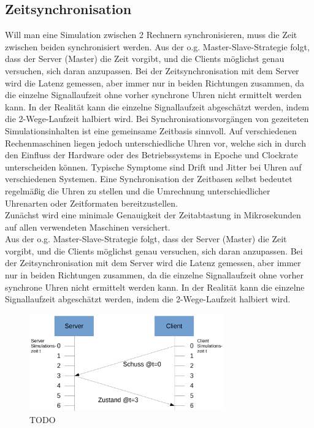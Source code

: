\subsection{Zeitsynchronisation}

Will man eine Simulation zwischen 2 Rechnern synchronisieren, muss die Zeit zwischen beiden synchronisiert werden. Aus der o.g. Master-Slave-Strategie folgt, dass der Server (Master) die Zeit vorgibt, und die Clients möglichst genau versuchen, sich daran anzupassen. Bei der Zeitsynchronisation mit dem Server wird die Latenz gemessen, aber immer nur in beiden Richtungen zusammen, da die einzelne Signallaufzeit ohne vorher synchrone Uhren nicht ermittelt werden kann. In der Realität kann die einzelne Signallaufzeit abgeschätzt werden, indem die 2-Wege-Laufzeit halbiert wird.
Bei Synchronisationsvorgängen von gezeiteten Simulationsinhalten ist eine gemeinsame Zeitbasis sinnvoll.
Auf verschiedenen Rechenmaschinen liegen jedoch unterschiedliche Uhren vor, welche sich
in durch den Einfluss der Hardware oder des Betriebssystems in Epoche und Clockrate unterscheiden können. Typische Symptome sind Drift und Jitter bei Uhren auf verschiedenen Systemen.
Eine Synchronisation der Zeitbasen selbst bedeutet regelmäßig die Uhren zu stellen und die Umrechnung
unterschiedlicher Uhrenarten oder Zeitformaten bereitzustellen.\\
Zunächst wird eine minimale Genauigkeit der Zeitabtastung in Mikrosekunden auf allen verwendeten Maschinen versichert.\\
Aus der o.g. Master-Slave-Strategie folgt, dass der Server (Master) die Zeit vorgibt, und die Clients möglichst genau versuchen, sich daran anzupassen. Bei der Zeitsynchronisation mit dem Server wird die Latenz gemessen, aber immer nur in beiden Richtungen zusammen, da die einzelne Signallaufzeit ohne vorher synchrone Uhren nicht ermittelt werden kann. In der Realität kann die einzelne Signallaufzeit abgeschätzt werden, indem die 2-Wege-Laufzeit halbiert wird.
\begin{figure}
    \centering
    \includegraphics[width=0.75\textwidth]{./Zeichnung1a.png}
    \caption{TODO}
    \label{fig:zeichnung1a}
\end{figure}
